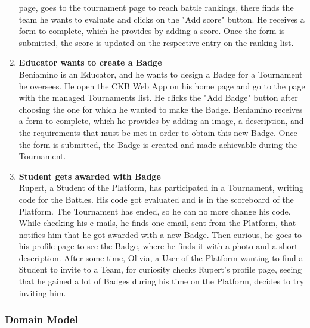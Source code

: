 \begin{enumerate}[label= \textbf{SC\arabic*}]
    page, goes to the tournament page to reach battle rankings, there finds the team he wants to evaluate and clicks on the "Add score" button. He receives a form to complete, which he provides by adding a score. Once the form is submitted, the score is 
    updated on the respective entry on the ranking list.
    \item \textbf{Educator wants to create a Badge} \label{sc:sc13} \\Beniamino is an Educator, and he wants to design a Badge for a Tournament he oversees. He open the CKB Web App on his home page and go to the page with the managed Tournaments list.
    He clicks the "Add Badge" button after choosing the one for which he wanted to make the Badge. Beniamino receives a form to complete, which he provides by adding an image, a description, and the requirements that must be met in order 
    to obtain this new Badge. Once the form is submitted, the Badge is created and made achievable during the Tournament.
    \item \textbf{Student gets awarded with Badge} \label{sc:sc14} \\
    Rupert, a Student of the Platform, has participated in a Tournament, writing code for the Battles. His code got evaluated and is in the scoreboard of the Platform. The Tournament has ended, so he can no more change his code. 
    While checking his e-mails, he finds one email, sent from the Platform, that notifies him that he got awarded with a new Badge.
    Then curious, he goes to his profile page to see the Badge, where he finds it with a photo and a short description.
    After some time, Olivia, a User of the Platform wanting to find a Student to invite to a Team, for curiosity checks Rupert's profile page, seeing that he gained a lot of Badges during his time on the Platform, decides to try inviting him.
\end{enumerate}

\newpage

\subsubsection{Domain Model}

